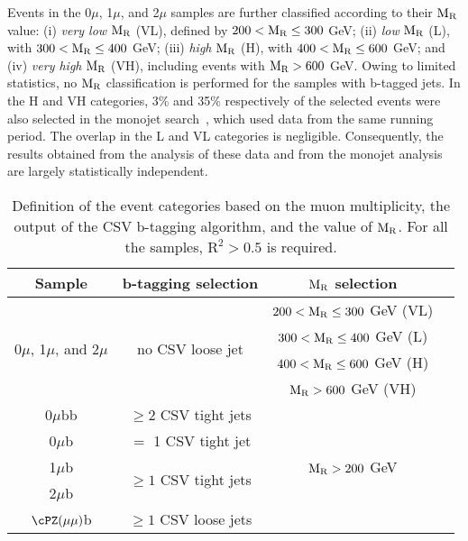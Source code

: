 {{Events in the 0$\mu$, 1$\mu$, and 2$\mu$ samples are further
classified according to their $\mathrm{M_{\rm R}}$ value: (i) {\it
  very low} $\mathrm{M_{\rm R}}$ (VL), defined by $200<\mathrm{M_{\rm R}}
\leq 300$ GeV; (ii) {\it low} $\mathrm{M_{\rm R}}$ (L), with $300
<\mathrm{M_{\rm R}} \leq 400$ GeV; (iii) {\it high} $\mathrm{M_{\rm R}}$ (H),
with $400 <\mathrm{M_{\rm R}}\leq 600$ GeV; and (iv) {\it very high}
$\mathrm{M_{\rm R}}$ (VH), including events with $\mathrm{M_{\rm
    R}}>600$ GeV. Owing to limited statistics, no
$\mathrm{M_{\rm R}}$ classification is performed for the samples with b-tagged
jets. %
In the H and VH categories, 3\% and 35\% respectively of the selected
events were also selected in the monojet search~\cite{monojet8TeV}, which used data from the same running period. 
The overlap 
in the L and VL categories is negligible. Consequently, the results
obtained from the analysis of these data and from the monojet analysis are largely statistically independent.
\begin{table}[h!]
  \caption{\label{tab:boxes} Definition of the event categories 
    based on the muon multiplicity, the output of the CSV b-tagging
    algorithm, and the value of $\mathrm{M_{\rm R}}$. For all the samples,
    $\mathrm{R^2}>0.5$ is required.}
  \centering
 \begin{tabular}{|c|c|c|c|}
  \hline
  Sample  &  b-tagging selection  &  $\mathrm{M_{\rm R}}$ selection \\
  \hline
  \multirow{4}{*}{0$\mu$, 1$\mu$, and 2$\mu$}  &  \multirow{4}{*}{no CSV loose jet}  &  $200<\mathrm{M_{\rm R}} \leq 300$ GeV (VL) \\
   &   &  $300<\mathrm{M_{\rm R}} \leq 400$ GeV (L) \\
   &   &  $400<\mathrm{M_{\rm R}} \leq 600$ GeV (H) \\
   &   &  $\mathrm{M_{\rm R}} > 600$ GeV (VH) \\
\hline
 0$\mu$bb  &  $\geq 2$ CSV tight jets  &  \multirow{5}{*}{$\mathrm{M_{\rm R}} > 200$ GeV} \\
\cline{1-2}
 0$\mu$b  &  $=$ 1 CSV tight jet    &  \\
\cline{1-2}
 1$\mu$b  &  \multirow{2}{*}{$\geq 1$ CSV tight jets}  &  \\
\cline{1-1}
 2$\mu$b  &   &  \\
\cline{1-2}
$\cPZ(\mu\mu)$b  &  $\geq 1$ CSV loose jets  &  \\
\hline
\end{tabular}
\end{table}

}}
